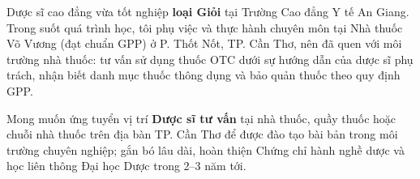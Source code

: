 \begin{cvparagraph}

Dược sĩ cao đẳng vừa tốt nghiệp \textbf{loại Giỏi} tại Trường Cao đẳng Y tế An Giang.
Trong suốt quá trình học, tôi phụ việc và thực hành chuyên môn tại Nhà thuốc Võ Vương
(đạt chuẩn GPP) ở P. Thốt Nốt, TP. Cần Thơ, nên đã quen với môi trường nhà thuốc: tư vấn sử dụng
thuốc OTC dưới sự hướng dẫn của dược sĩ phụ trách, nhận biết danh mục thuốc thông dụng
và bảo quản thuốc theo quy định GPP.

Mong muốn ứng tuyển vị trí \textbf{Dược sĩ tư vấn} tại nhà thuốc, quầy thuốc hoặc chuỗi
nhà thuốc trên địa bàn TP. Cần Thơ để được đào tạo bài bản trong môi trường chuyên
nghiệp; gắn bó lâu dài, hoàn thiện Chứng chỉ hành nghề dược và học liên thông Đại học
Dược trong 2--3 năm tới.

\end{cvparagraph}
